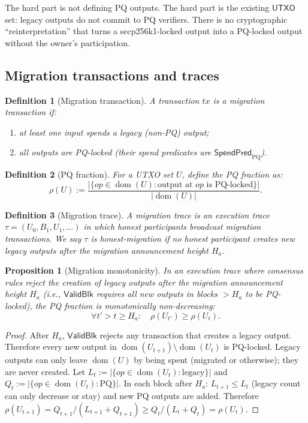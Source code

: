 \documentclass[11pt]{article}
\newtheorem{definition}{Definition}
\newtheorem{proposition}[theorem]{Proposition}
\newcommand{\dom}{\operatorname{dom}}
\newcommand{\UTXO}{\mathsf{UTXO}}
\newcommand{\ValidBlk}{\mathsf{ValidBlk}}
\newcommand{\SpendPred}{\mathsf{SpendPred}}
\newcommand{\SpendPredPQ}{\SpendPred_{\mathrm{PQ}}}
\begin{document}
The hard part is not defining PQ outputs.
The hard part is the existing $\UTXO$ set: legacy outputs do not commit to PQ verifiers.
There is no cryptographic ``reinterpretation'' that turns a secp256k1-locked output into a PQ-locked output without the owner's participation.

\subsection{Migration transactions and traces}

\begin{definition}[Migration transaction]
A transaction $tx$ is a \emph{migration transaction} if:
\begin{enumerate}[leftmargin=2em]
  \item at least one input spends a legacy (non-PQ) output;
  \item all outputs are PQ-locked (their spend predicates are $\SpendPredPQ$).
\end{enumerate}
\end{definition}

\begin{definition}[PQ fraction]
For a UTXO set $U$, define the \emph{PQ fraction} as:
\[
\rho(U) := \frac{|\{op\in\dom(U) : \text{output at }op\text{ is PQ-locked}\}|}{|\dom(U)|}.
\]
\end{definition}

\begin{definition}[Migration trace]
A migration trace is an execution trace $\tau=(U_0,B_1,U_1,\dots)$ in which honest participants broadcast migration transactions.
We say $\tau$ is \emph{honest-migration} if no honest participant creates new legacy outputs after the migration announcement height $H_a$.
\end{definition}

\begin{proposition}[Migration monotonicity]\label{prop:migration-mono}
In an execution trace where consensus rules reject the creation of legacy outputs after the migration announcement height $H_a$ (i.e., $\ValidBlk$ requires all new outputs in blocks $>H_a$ to be PQ-locked), the PQ fraction is monotonically non-decreasing:
\[
\forall t' > t \ge H_a:\quad \rho(U_{t'}) \ge \rho(U_t).
\]
\end{proposition}

\begin{proof}
After $H_a$, $\ValidBlk$ rejects any transaction that creates a legacy output.
Therefore every new output in $\dom(U_{t+1})\setminus\dom(U_t)$ is PQ-locked.
Legacy outputs can only leave $\dom(U)$ by being spent (migrated or otherwise); they are never created.
Let $L_t:=|\{op\in\dom(U_t):\text{legacy}\}|$ and $Q_t:=|\{op\in\dom(U_t):\text{PQ}\}|$.
In each block after $H_a$: $L_{t+1}\le L_t$ (legacy count can only decrease or stay) and new PQ outputs are added.
Therefore $\rho(U_{t+1})=Q_{t+1}/(L_{t+1}+Q_{t+1})\ge Q_t/(L_t+Q_t)=\rho(U_t)$.
\end{proof}
\end{document}
